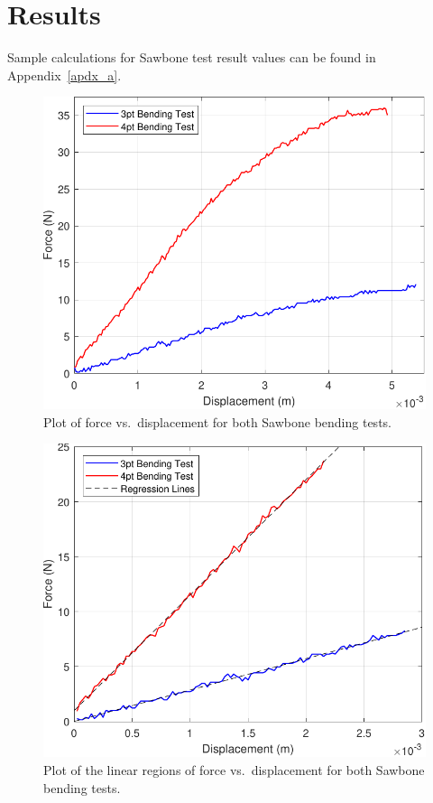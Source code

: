 \documentclass[conference, letterpaper]{IEEEtran}
\begin{document}
\section{Results}
    Sample calculations for Sawbone test result values can be found in Appendix~\ref{apdx_a}.
    \begin{figure}[htbp]
        \centerline{\includegraphics[width = 0.65\linewidth]{sawbones_fd.pdf}}
        \caption{Plot of force vs.\ displacement for both Sawbone bending tests.}\label{sawbones_fd}
    \end{figure}
    \vspace*{-\baselineskip}
    \begin{figure}[htbp]
        \centerline{\includegraphics[width = 0.65\linewidth]{sawbones_linear.pdf}}
        \caption{Plot of the linear regions of force vs.\ displacement for both Sawbone bending tests.}\label{sawbones_linear}
    \end{figure}
\end{document}
